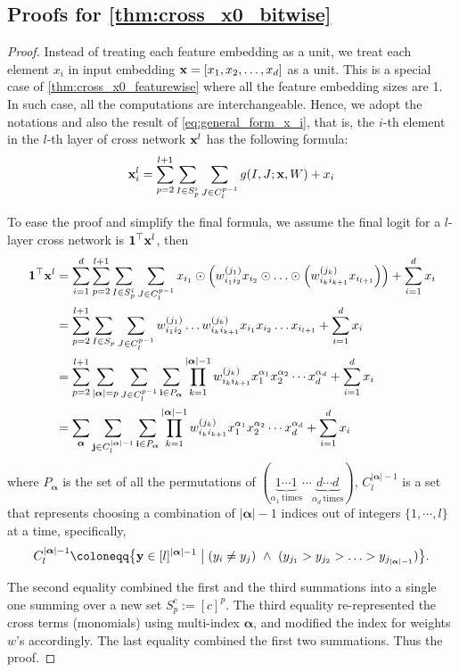 \documentclass[sigconf]{acmart}
\newcommand{\vecx}{{\bf x}}
\newcommand{\vecy}{{\bf y}}
\newcommand{\veci}{{\bf i}}
\newcommand{\vecj}{{\bf j}}
\newcommand{\vecalpha}{{\bm \alpha}}
\begin{document}
\subsection{Proofs for \autoref{thm:cross_x0_bitwise}}
\begin{proof}
Instead of treating each feature embedding as a unit, we treat each element $x_i$ in input embedding $\vecx = [x_1, x_2, \ldots, x_d]$ as a unit. This is a special case of \autoref{thm:cross_x0_featurewise} where all the feature embedding sizes are 1.  In such case, all the computations are interchangeable. Hence, we adopt the notations and also the result of \autoref{eq:general_form_x_i}, that is, the $i$-th element in the $l$-th layer of cross network $\vecx^l$ has the following formula:
\begin{equation}
\label{eq:general_form_x_i_bit}
\vecx_i^l = \sum_{p=2}^{l+1} \sum_{I \in S_p^i} \sum_{J \in C_l^{p-1}} g(I, J; \vecx, W) + x_i
\end{equation}

To ease the proof and simplify the final formula, we assume the final logit for a $l$-layer cross network is ${\bf 1}^\top \vecx^l$, then
\begin{equation*}
\begin{split}
    {\bf 1}^\top \vecx^l &= \sum_{i=1}^d \sum_{p=2}^{l+1} \sum_{I \in S_p^i} \sum_{J \in C_l^{p-1}} x_{i_1} \odot \left(w_{i_1i_2}^{(j_1)} x_{i_2} \odot \ldots \odot \left(w_{i_ki_{k+1}}^{(j_{k})} x_{i_{l+1}}\right) \right) + \sum_{i=1}^dx_i\\
    &= \sum_{p=2}^{l+1} \sum_{I \in S_p} \sum_{J \in C_l^{p-1}}  w_{i_1i_2}^{(j_1)} \ldots w_{i_ki_{k+1}}^{(j_{k})} x_{i_1} x_{i_2}  \ldots x_{i_{l+1}} +  \sum_{i=1}^dx_i\\
    &=  \sum_{p=2}^{l+1} \sum_{|\vecalpha| = p} \sum_{J \in C_l^{p-1}}  \sum_{\veci \in P_\vecalpha} \prod_{k=1}^{|\vecalpha|-1} w_{i_k i_{k+1}}^{(j_k)} x_1^{\alpha_1}x_2^{\alpha_2}\cdots x_d^{\alpha_d} +  \sum_{i=1}^dx_i\\
    &=   \sum_{\vecalpha} \sum_{\vecj \in C_l^{|\vecalpha|-1}}  \sum_{\veci \in P_\vecalpha} \prod_{k=1}^{|\vecalpha|-1} w_{i_k i_{k+1}}^{(j_k)} x_1^{\alpha_1}x_2^{\alpha_2}\cdots x_d^{\alpha_d}+  \sum_{i=1}^dx_i
\end{split}
\end{equation*}
where $P_\vecalpha$ is the set of all the permutations of $(\underbrace{1 \cdots 1}_{\alpha_1~ \text{times}} \cdots \underbrace{d \cdots d}_{\alpha_d~ \text{times}})$, $C_l^{|\vecalpha|-1}$ is a set that represents choosing a combination of $|\vecalpha|-1$ indices out of integers $\{1,\cdots, l\}$ at a time, specifically,
$$C_l^{|\vecalpha|-1} \coloneqq \bigl\{\vecy \in [l]^{|\vecalpha|-1} \mathrel{\big|} (y_i \neq y_j) ~\wedge~ (y_{j_1} > y_{j_2} > \ldots > y_{j_{|\vecalpha|-1}}) \bigr\}.$$

The second equality combined the first and the third summations into a single one summing over a new set $S_p^c := [c]^{p}$. The third equality re-represented the cross terms (monomials) using multi-index $\vecalpha$, and modified the index for weights $w$'s accordingly. The last equality combined the first two summations. Thus the proof.
\end{proof}
\end{document}
